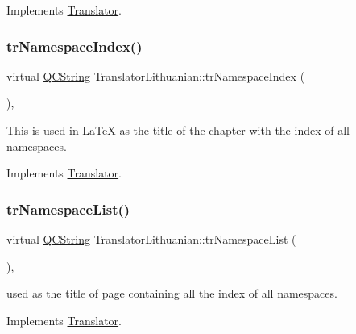 Implements \mbox{\hyperlink{class_translator}{Translator}}.

\mbox{\label{class_translator_lithuanian_af7e43e2ea2244a04459bab3e98abbdc6}} 
\subsubsection{\texorpdfstring{trNamespaceIndex()}{trNamespaceIndex()}}
{\footnotesize\ttfamily virtual \mbox{\hyperlink{class_q_c_string}{Q\+C\+String}} Translator\+Lithuanian\+::tr\+Namespace\+Index (\begin{DoxyParamCaption}{ }\end{DoxyParamCaption})\hspace{0.3cm}{\ttfamily [inline]}, {\ttfamily [virtual]}}

This is used in La\+TeX as the title of the chapter with the index of all namespaces. 

Implements \mbox{\hyperlink{class_translator}{Translator}}.

\mbox{\label{class_translator_lithuanian_ad0aa635e4932d26907e0e85031e79825}} 
\subsubsection{\texorpdfstring{trNamespaceList()}{trNamespaceList()}}
{\footnotesize\ttfamily virtual \mbox{\hyperlink{class_q_c_string}{Q\+C\+String}} Translator\+Lithuanian\+::tr\+Namespace\+List (\begin{DoxyParamCaption}{ }\end{DoxyParamCaption})\hspace{0.3cm}{\ttfamily [inline]}, {\ttfamily [virtual]}}

used as the title of page containing all the index of all namespaces. 

Implements \mbox{\hyperlink{class_translator}{Translator}}.

\mbox{\label{class_translator_lithuanian_accd126474f0d02f7e65738961c5889b1}} 
